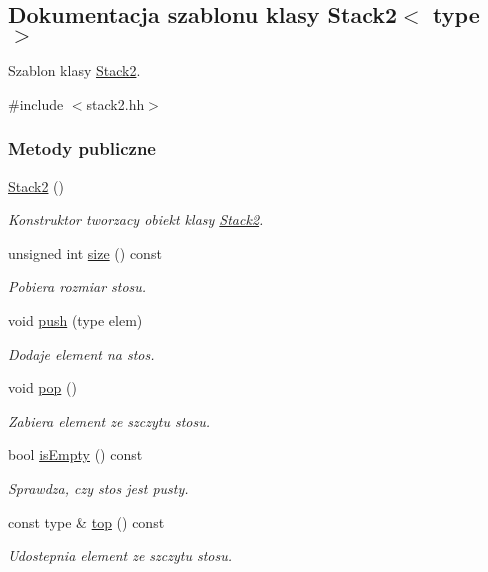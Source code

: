 \hypertarget{class_stack2}{\subsection{Dokumentacja szablonu klasy Stack2$<$ type $>$}
\label{class_stack2}
}


Szablon klasy \hyperlink{class_stack2}{Stack2}.  




{\ttfamily \#include $<$stack2.\-hh$>$}

\subsubsection*{Metody publiczne}
\begin{DoxyCompactItemize}
\item 
\hyperlink{class_stack2_a849bc90e36c6b8588eb1bf6d8ef36b67}{Stack2} ()
\begin{DoxyCompactList}\small\item\em Konstruktor tworzacy obiekt klasy \hyperlink{class_stack2}{Stack2}. \end{DoxyCompactList}\item 
unsigned int \hyperlink{class_stack2_a73b00332fd6b866467274eee22f64c5c}{size} () const 
\begin{DoxyCompactList}\small\item\em Pobiera rozmiar stosu. \end{DoxyCompactList}\item 
void \hyperlink{class_stack2_a2b8e509798027a1190104efca57d394f}{push} (type elem)
\begin{DoxyCompactList}\small\item\em Dodaje element na stos. \end{DoxyCompactList}\item 
void \hyperlink{class_stack2_a5f8d296af6ed73cf0383563d7d30c71c}{pop} ()
\begin{DoxyCompactList}\small\item\em Zabiera element ze szczytu stosu. \end{DoxyCompactList}\item 
bool \hyperlink{class_stack2_a2771c7588eda61532d6cd886a010d780}{is\-Empty} () const 
\begin{DoxyCompactList}\small\item\em Sprawdza, czy stos jest pusty. \end{DoxyCompactList}\item 
const type \& \hyperlink{class_stack2_a6461bd2cf6719fe6cf177eb53bd6850d}{top} () const 
\begin{DoxyCompactList}\small\item\em Udostepnia element ze szczytu stosu. \end{DoxyCompactList}\end{DoxyCompactItemize}
